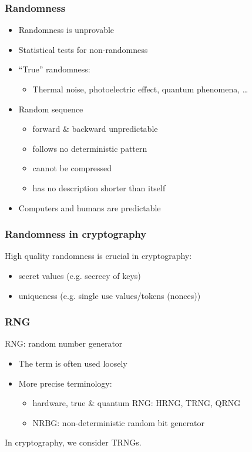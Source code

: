 \begin{frame}
  \frametitle{Randomness}

  \begin{itemize}[<+->]
    \item Randomness is unprovable
    \item Statistical tests for non-randomness
    \item \enquote{True} randomness:
    \begin{itemize}
      \item Thermal noise, photoelectric effect, quantum phenomena, \dots
    \end{itemize}
    \vspace*{1em}
    \item Random sequence
    \begin{itemize}
      \item forward \& backward unpredictable
      \item follows no deterministic pattern
      \item cannot be compressed
      \item has no description shorter than itself
    \end{itemize}
    \vspace*{1em}
    \item Computers and humans are predictable
  \end{itemize}
\end{frame}

\begin{frame}
  \frametitle{Randomness in cryptography}

  High quality randomness is crucial in cryptography:
  \begin{itemize}[<+(1)->]
    \item secret values (e.g. secrecy of keys)
    \item uniqueness (e.g. single use values/tokens (nonces))
  \end{itemize}
\end{frame}

\begin{frame}
  \frametitle{RNG}

  RNG: random number generator
  \begin{itemize}[<+(1)->]
    \item The term is often used loosely
    \item More precise terminology:
    \begin{itemize}
      \item hardware, true \& quantum RNG: HRNG, TRNG, QRNG
      \item NRBG: non-deterministic random bit generator
    \end{itemize}
  \end{itemize}

  \vspace*{1em}

  \pause
  In cryptography, we consider TRNGs.
\end{frame}

